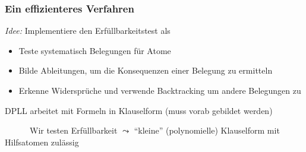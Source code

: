 \documentclass[aspectratio=1610,onlymath]{beamer}
\let\beameroriginaldoublebackslash\\
\let\\=\beameroriginaldoublebackslash
\begin{document}
\begin{frame}\frametitle{Ein effizienteres Verfahren}

\emph{Idee:} Implementiere den Erfüllbarkeitstest als 
\begin{itemize}
\item \alert{Teste systematisch Belegungen} für Atome
\item \alert{Bilde Ableitungen}, um die Konsequenzen einer Belegung zu ermitteln
\item Erkenne Widersprüche und verwende \alert{Backtracking} um andere Belegungen zu 
\end{itemize}
\medskip

DPLL arbeitet mit Formeln in \alert{Klauselform} (muss vorab gebildet werden)\\[1ex]
{\footnotesize \mbox{}~~~~~~Wir testen Erfüllbarkeit $\leadsto$ "`kleine"' (polynomielle) Klauselform mit Hilfsatomen zulässig

}\bigskip



\end{frame}

% 
% 
% 
% 
\end{document}
